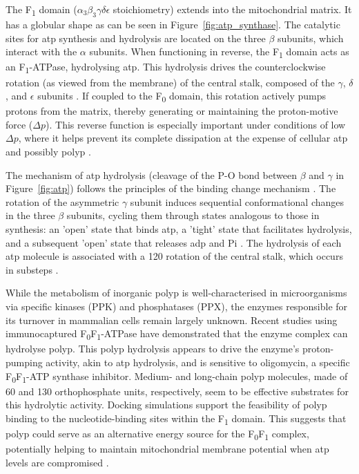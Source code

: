The F\textsubscript{1} domain ($\alpha_3\beta_3\gamma\delta\epsilon$ stoichiometry) extends into the mitochondrial matrix. It has a globular shape as can be seen in Figure~\ref{fig:atp_synthase}. The catalytic sites for \ac{atp} synthesis and hydrolysis are located on the three $\beta$ subunits, which interact with the $\alpha$ subunits. When functioning in reverse, the F\textsubscript{1} domain acts as an F\textsubscript{1}-ATPase, hydrolysing \ac{atp}. This hydrolysis drives the counterclockwise rotation (as viewed from the membrane) of the central stalk, composed of the $\gamma$, $\delta$, and $\epsilon$ subunits \citep{walkerATPSynthesisRotary1998, walkerATPSynthaseUnderstood2013, boyerEnergyLifeATP1998}. If coupled to the F\textsubscript{0} domain, this rotation actively pumps protons from the matrix, thereby generating or maintaining the proton-motive force ($\Delta p$). This reverse function is especially important under conditions of low $\Delta p$, where it helps prevent its complete dissipation at the expense of cellular \ac{atp} and possibly \ac{polyp} \citep{bonoraATPSynthesisStorage2012, walkerATPSynthaseUnderstood2013, baevInorganicPolyphosphateProduced2020}.

The mechanism of \ac{atp} hydrolysis (cleavage of the P-O bond between $\beta$ and $\gamma$ in Figure~\ref{fig:atp}) follows the principles of the binding change mechanism \citep{walkerATPSynthaseUnderstood2013}. The rotation of the asymmetric $\gamma$ subunit induces sequential conformational changes in the three $\beta$ subunits, cycling them through states analogous to those in synthesis: an 'open' state that binds \ac{atp}, a 'tight' state that facilitates hydrolysis, and a subsequent 'open' state that releases \ac{adp} and \ac{Pi} \citep{walkerATPSynthesisRotary1998, boyerEnergyLifeATP1998}. The hydrolysis of each \ac{atp} molecule is associated with a 120\textdegree{} rotation of the central stalk, which occurs in substeps \citep{walkerATPSynthaseUnderstood2013}.

While the metabolism of inorganic \ac{polyp} is well-characterised in microorganisms via specific kinases (PPK) and phosphatases (PPX), the enzymes responsible for its turnover in mammalian cells remain largely unknown. Recent studies using immunocaptured F\textsubscript{0}F\textsubscript{1}-ATPase have demonstrated that the enzyme complex can hydrolyse \ac{polyp}. This \ac{polyp} hydrolysis appears to drive the enzyme's proton-pumping activity, akin to \ac{atp} hydrolysis, and is sensitive to oligomycin, a specific F\textsubscript{0}F\textsubscript{1}-ATP synthase inhibitor. Medium- and long-chain \ac{polyp} molecules, made of 60 and 130 orthophosphate units, respectively, seem to be effective substrates for this hydrolytic activity. Docking simulations support the feasibility of \ac{polyp} binding to the nucleotide-binding sites within the F\textsubscript{1} domain. This suggests that \ac{polyp} could serve as an alternative energy source for the F\textsubscript{0}F\textsubscript{1} complex, potentially helping to maintain mitochondrial membrane potential when \ac{atp} levels are compromised \citep{baevInorganicPolyphosphateProduced2020, baevInorganicPolyphosphateF0F1ATP2022}.

